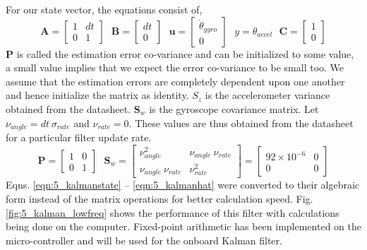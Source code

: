 For our state vector, the equations consist of,
\begin{equation}
\bm{A} = \left[ \begin{array}{cc} 1& dt\\0&1\end{array}\right]\:\:\:\bm{B} = \left[ \begin{array}{c} dt\\0\end{array}\right]\:\:\:
\bm{u} = \left[ \begin{array}{c} \dot{\theta}_{gyro}\\0\end{array}\right]\:\:\:y = \theta_{accel}\:\:\: \bm{C} = \left[ \begin{array}{c} 1\\0\end{array}\right]
\end{equation}
$\bm{P}$ is called the estimation error co-variance and can be initialized to some value, a small value implies that we expect the
error co-variance to be small too. We assume that the estimation errors are completely dependent upon one another and hence
initialize the matrix as identity. $S_z$ is the accelerometer variance obtained from the datasheet. $\bm{S}_w$ is the gyroscope
covariance matrix. Let $\nu_{angle} = dt\:\sigma_{rate}$ and $\nu_{rate} = 0$. These values are thus obtained from the datasheet
for a particular filter update rate.
\begin{equation}
\bm{P} = \left[ \begin{array}{cc} 1& 0\\0&1\end{array}\right]\:\:\:\bm{S}_w = \left[ \begin{array}{cc} \nu_{angle}^2 &\nu_{angle}\:\nu_{rate}\\ \nu_{angle}\:\nu_{rate}&\nu_{rate}^2\end{array}\right] = \left[ \begin{array}{cc} 
92\times10^{-6} &0\\0&0\end{array}\right]
\end{equation}
Eqns. \ref{eqn:5_kalmanstate} -- \ref{eqn:5_kalmanhat} were converted to their algebraic 
form instead of the matrix operations for better calculation speed. Fig. \ref{fig:5_kalman_lowfreq} shows the performance of this
filter with calculations being done on the computer. Fixed-point arithmetic has been implemented on the micro-controller and will
be used for the onboard Kalman filter.

